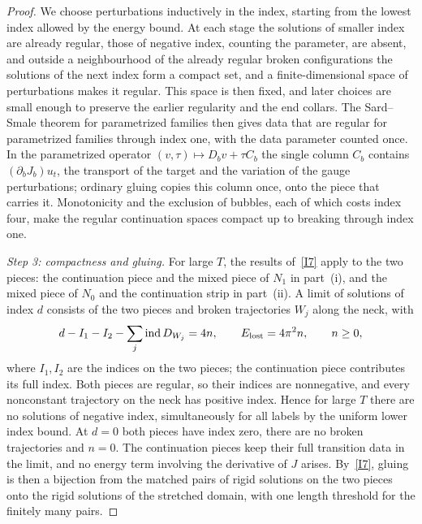 \documentclass[11pt]{amsart}
\theoremstyle{definition}
\theoremstyle{remark}
\theoremstyle{plain}
\numberwithin{equation}{section}
\newcommand{\ind}{\operatorname{ind}}
\begin{document}
\begin{proof}
We choose perturbations inductively in the index, starting from the
lowest index allowed by the energy bound. At each stage the solutions of smaller index are already regular, those of negative index, counting the parameter, are absent, and outside a neighbourhood of the already regular broken configurations the solutions of the next index form a compact set, and a
finite-dimensional space of perturbations makes it regular. This space
is then fixed, and later choices are small enough to preserve the
earlier regularity and the end collars. The Sard--Smale theorem for
parametrized families then gives data that are regular for
parametrized families through index one, with the data parameter
counted once. In the parametrized operator
$(v,\tau)\mapsto D_bv+\tau C_b$ the single column $C_b$ contains
$(\partial_bJ_b)u_t$, the transport of the target and the variation
of the gauge perturbations; ordinary gluing copies this column once,
onto the piece that carries it. Monotonicity and the exclusion of bubbles, each of which costs index four, make the regular continuation spaces compact up to breaking through index one.

\emph{Step 3: compactness and gluing.} For large $T$, the results
of~\ref{I7} apply to the two pieces: the continuation piece and the
mixed piece of $N_1$ in part~(i), and the mixed piece of $N_0$ and the
continuation strip in part~(ii). A limit of solutions of index $d$
consists of the two pieces and broken trajectories $W_j$ along the
neck, with
\[
 d-I_1-I_2-\sum_j\ind D_{W_j}=4n,\qquad
 E_{\rm lost}=4\pi^2 n,\qquad n\geq0,
\]
where $I_1,I_2$ are the indices on the two pieces; the continuation
piece contributes its full index. Both pieces are regular, so their
indices are nonnegative, and every nonconstant trajectory on the
neck has positive index. Hence for large $T$ there are no solutions of
negative index, simultaneously for all labels by the uniform lower
index bound. At $d=0$ both pieces have index zero, there are no broken
trajectories and $n=0$. The continuation pieces keep their full
transition data in the limit, and no energy term involving the
derivative of $J$ arises. By~\ref{I7}, gluing is then a bijection from the matched
pairs of rigid solutions on the two pieces onto the rigid solutions of
the stretched domain, with one length threshold for the finitely many
pairs.


\end{proof}
\end{document}
